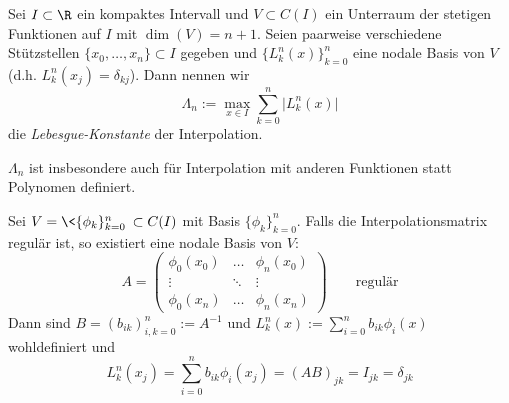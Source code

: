 \documentclass[11pt]{scrbook}
\begin{document}
\begin{df} \label{1.17}
	Sei $I\subset \R$ ein kompaktes Intervall und $V\subset C(I)$ ein Unterraum der stetigen Funktionen auf $I$ mit $\dim(V)=n+1$.
	Seien paarweise verschiedene Stützstellen $\{x_0,\dotsc, x_n\}\subset I$ gegeben und $\{L_k^n(x)\}_{k=0}^n$ eine nodale Basis von $V$ (d.h. $L_k^n(x_j) = \delta_{kj}$).
	Dann nennen wir
	\[
		\Lambda_n := \max_{x\in I}\sum_{k=0}^n \big|L_k^n(x)\big|
	\]
	die \emph{Lebesgue-Konstante} der Interpolation.
\end{df}

\begin{note}
	$\Lambda_n$ ist insbesondere auch für Interpolation mit anderen Funktionen statt Polynomen definiert.

	Sei $V=\<\{\phi_k\}_{k=0}^n\> \subset C(I)$ mit Basis $\{\phi_k\}_{k=0}^n$.
	Falls die Interpolationsmatrix regulär ist, so existiert eine nodale Basis von $V$:
	\[
		A=\begin{pmatrix}
			\phi_0(x_0) & \hdots & \phi_n(x_0)\\
			\vdots & \ddots & \vdots\\
			\phi_0(x_n) & \hdots & \phi_n(x_n)
		\end{pmatrix}
		\qquad \text{regulär}
	\]
	Dann sind $B=(b_{ik})_{i,k=0}^n := A^{-1}$ und $L_k^n(x) := \sum_{i=0}^n b_{ik}\phi_i(x)$ wohldefiniert und
	\[
		L_k^n (x_j) = \sum_{i=0}^n b_{ik}\phi_i(x_j) = (A B)_{jk} = I_{jk} = \delta_{jk}
	\]
\end{note}
\end{document}
